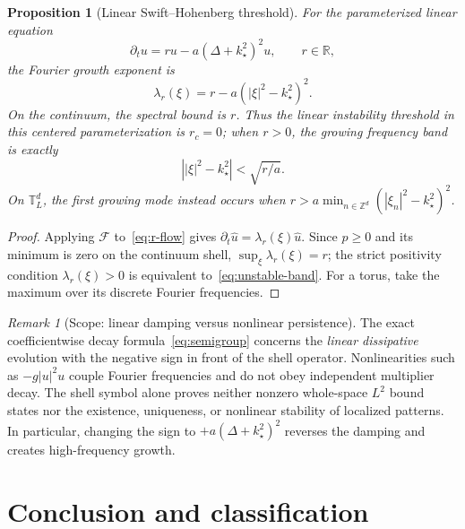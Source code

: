 \documentclass[11pt]{article}
\newtheorem{proposition}[theorem]{Proposition}
\theoremstyle{remark}
\newtheorem{remark}[theorem]{Remark}
\newcommand{\R}{\mathbb{R}}
\newcommand{\T}{\mathbb{T}}
\newcommand{\sF}{\mathcal{F}}
\newcommand{\abs}[1]{\left\lvert #1\right\rvert}
\begin{document}
\begin{proposition}[Linear Swift--Hohenberg threshold]
For the parameterized linear equation
\begin{equation}\label{eq:r-flow}
\partial_tu=ru-a(\Delta+k_\star^2)^2u,
\qquad r\in\R,
\end{equation}
the Fourier growth exponent is
\begin{equation}\label{eq:r-growth}
\lambda_r(\xi)=r-a(\abs{\xi}^2-k_\star^2)^2.
\end{equation}
On the continuum, the spectral bound is $r$.  Thus the linear
instability threshold in this centered parameterization is $r_c=0$;
when $r>0$, the growing frequency band is exactly
\begin{equation}\label{eq:unstable-band}
\abs{\abs{\xi}^2-k_\star^2}<\sqrt{r/a}.
\end{equation}
On $\T_L^d$, the first growing mode instead occurs when
$r>a\min_{n\in\mathbb Z^d}(\abs{\xi_n}^2-k_\star^2)^2$.
\end{proposition}
\begin{proof}
Applying $\sF$ to~\eqref{eq:r-flow} gives
$\partial_t\widehat u=\lambda_r(\xi)\widehat u$.
Since $p\ge0$ and its minimum is zero on the continuum shell,
$\sup_\xi\lambda_r(\xi)=r$; the strict positivity condition
$\lambda_r(\xi)>0$ is equivalent to~\eqref{eq:unstable-band}.
For a torus, take the maximum over its discrete Fourier frequencies.
\end{proof}

\begin{remark}[Scope: linear damping versus nonlinear persistence]
The exact coefficientwise decay formula~\eqref{eq:semigroup} concerns
the \emph{linear dissipative} evolution with the negative sign in front
of the shell operator.  Nonlinearities such as $-g\abs{u}^2u$ couple
Fourier frequencies and do not obey independent multiplier decay.
The shell symbol alone proves neither nonzero whole-space $L^2$ bound
states nor the existence, uniqueness, or nonlinear stability of
localized patterns.  In particular, changing the sign to
$+a(\Delta+k_\star^2)^2$ reverses the damping and creates
high-frequency growth.
\end{remark}

\section*{Conclusion and classification}
\end{document}
